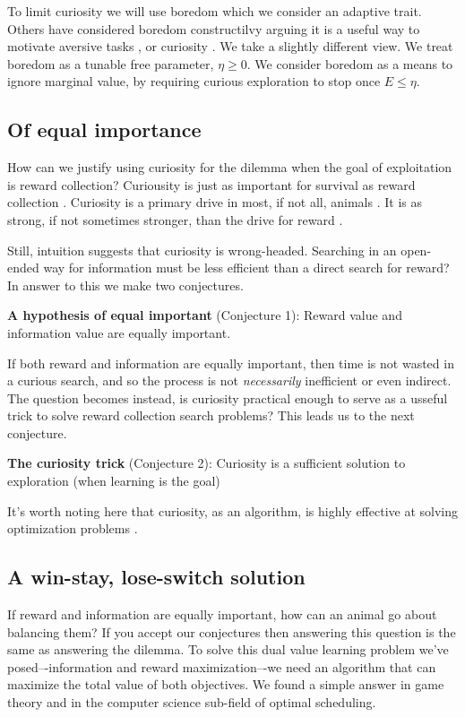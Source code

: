 To limit curiosity we will use boredom which we consider an adaptive trait. Others have considered boredom constructilvy arguing it is a useful way to motivate aversive tasks \citep{Bench2013}, or curiosity \cite{Loewenstein1994}. We take a slightly different view. We treat boredom as a tunable free parameter, $\eta \ge 0$. We consider boredom as a means to ignore marginal value, by requiring curious exploration to stop once $E \le \eta$. 


\subsection{Of equal importance}
How can we justify using curiosity for the dilemma when the goal of exploitation is reward collection? Curiousity is just as important for survival as reward collection \cite{Thrun1992}. Curiosity is a primary drive in most, if not all, animals \cite{Inglis2001}. It is as strong, if not sometimes stronger, than the drive for reward \cite{Loewenstein1994,Kidd2015,Gottlieb2018}. 

Still, intuition suggests that curiosity is wrong-headed. Searching in an open-ended way for information must be less efficient than a direct search for reward? In answer to this we make two conjectures.

\textbf{A hypothesis of equal important} (Conjecture 1): Reward value and information value are equally important.

If both reward and information are equally important, then time is not wasted in a curious search, and so the process is not \textit{necessarily} inefficient or even indirect. The question becomes instead, is curiosity practical enough to serve as a usseful trick to solve reward collection search problems? This leads us to the next conjecture. 

\textbf{The curiosity trick} (Conjecture 2): Curiosity is a sufficient solution to exploration (when learning is the goal)

It's worth noting here that curiosity, as an algorithm, is highly effective at solving optimization problems \cite{Schmidhuber1991,Pathak2017,Stanton2018,Lehman201,Mouret2011b1,Fister2019,Mouret2015,Colas2020,Cully2015,Pathak2017,Schwartenbeck2019.Laversanne-Finot2018}. 


\subsection{A win-stay, lose-switch solution}
If reward and information are equally important, how can an animal go about balancing them? If you accept our conjectures then answering this question is the same as answering the dilemma. To solve this dual value learning problem we’ve posed–-information and reward maximization–-we need an algorithm that can maximize the total value of both objectives. We found a simple answer in game theory and in the computer science sub-field of optimal scheduling.


